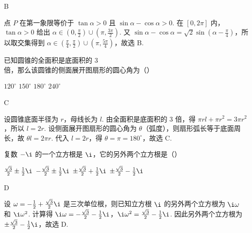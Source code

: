 \begin{answer}
B
\end{answer}

\begin{solution}
点 \(P\) 在第一象限等价于 \(\tan\alpha>0\) 且 \(\sin\alpha-\cos\alpha>0\). 在 \([0,2\pi]\) 内，\(\tan\alpha>0\) 给出
\(\alpha\in\left(0,\frac{\pi}{2}\right)\cup\left(\pi,\frac{3\pi}{2}\right)\). 又
\(\sin\alpha-\cos\alpha=\sqrt{2}\sin\left(\alpha-\frac{\pi}{4}\right)\)，所以取交集得到
\(\alpha\in\left(\frac{\pi}{4},\frac{\pi}{2}\right)\cup\left(\pi,\frac{5\pi}{4}\right)\)，故选 B.
\end{solution}

\begin{problem}
已知圆锥的全面积是底面积的 \(3\) 倍，那么该圆锥的侧面展开图扇形的圆心角为（\quad）

\choices
    {\(120^{\circ}\)}
    {\(150^{\circ}\)}
    {\(180^{\circ}\)}
    {\(240^{\circ}\)}
\end{problem}

\begin{answer}
C
\end{answer}

\begin{solution}
设圆锥底面半径为 \(r\)，母线长为 \(l\). 由全面积是底面积的 \(3\) 倍，得
\(\pi r l+\pi r^{2}=3\pi r^{2}\)，所以 \(l=2r\). 设侧面展开图扇形的圆心角为 \(\theta\)（弧度），则扇形弧长等于底面周长，故 \(\theta l=2\pi r\). 代入 \(l=2r\)，得 \(\theta=\pi=180^{\circ}\)，故选 C.
\end{solution}

\begin{problem}
复数 \(-\i\) 的一个立方根是 \(\i\)，它的另外两个立方根是（\quad）

\choices
    {\(\frac{\sqrt{3}}{2} \pm \frac{1}{2}\i\)}
    {\(-\frac{\sqrt{3}}{2} \pm \frac{1}{2}\i\)}
    {\(\pm\frac{\sqrt{3}}{2} + \frac{1}{2}\i\)}
    {\(\pm\frac{\sqrt{3}}{2} - \frac{1}{2}\i\)}
\end{problem}

\begin{answer}
D
\end{answer}

\begin{solution}
设 \(\omega=-\frac{1}{2}+\frac{\sqrt{3}}{2}\i\) 是三次单位根，则已知立方根 \(\i\) 的另外两个立方根为 \(\i\omega\) 和 \(\i\omega^{2}\). 计算得
\(\i\omega=-\frac{\sqrt{3}}{2}-\frac{1}{2}\i\)，\(\i\omega^{2}=\frac{\sqrt{3}}{2}-\frac{1}{2}\i\). 因此另外两个立方根为 \(\pm\frac{\sqrt{3}}{2}-\frac{1}{2}\i\)，故选 D.
\end{solution}

